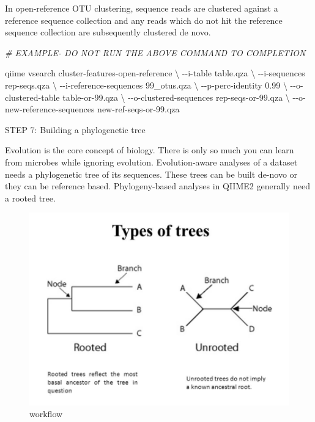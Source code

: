 \documentclass[
]{book}
\newenvironment{Shaded}{\begin{snugshade}}{\end{snugshade}}
\newcommand{\CommentTok}[1]{\textcolor[rgb]{0.56,0.35,0.01}{\textit{#1}}}
\newcommand{\DataTypeTok}[1]{\textcolor[rgb]{0.13,0.29,0.53}{#1}}
\newcommand{\ExtensionTok}[1]{#1}
\newcommand{\NormalTok}[1]{#1}
\begin{document}
In open-reference OTU clustering, sequence reads are clustered against a reference sequence collection and any reads which do not hit the reference sequence collection are subsequently clustered de novo.

\begin{Shaded}
\begin{Highlighting}[]

\CommentTok{\# EXAMPLE{-} DO NOT RUN THE ABOVE COMMAND TO COMPLETION}

\ExtensionTok{qiime}\NormalTok{ vsearch cluster{-}features{-}open{-}reference }\DataTypeTok{\textbackslash{}}
\NormalTok{{-}{-}i{-}table table.qza }\DataTypeTok{\textbackslash{}}
\NormalTok{{-}{-}i{-}sequences rep{-}seqs.qza }\DataTypeTok{\textbackslash{}}
\NormalTok{{-}{-}i{-}reference{-}sequences 99\_otus.qza }\DataTypeTok{\textbackslash{}}
\NormalTok{{-}{-}p{-}perc{-}identity 0.99 }\DataTypeTok{\textbackslash{}}
\NormalTok{{-}{-}o{-}clustered{-}table table{-}or{-}99.qza }\DataTypeTok{\textbackslash{}}
\NormalTok{{-}{-}o{-}clustered{-}sequences rep{-}seqs{-}or{-}99.qza }\DataTypeTok{\textbackslash{}}
\NormalTok{{-}{-}o{-}new{-}reference{-}sequences new{-}ref{-}seqs{-}or{-}99.qza}
\end{Highlighting}
\end{Shaded}

STEP 7: Building a phylogenetic tree

Evolution is the core concept of biology. There is only so much you can learn from microbes while ignoring evolution. Evolution-aware analyses of a dataset needs a phylogenetic tree of its sequences. These trees can be built de-novo or they can be reference based. Phylogeny-based analyses in QIIME2 generally need a rooted tree.

\begin{figure}
\centering
\includegraphics[width=1\textwidth,height=\textheight]{./QIIMEpics/forlyx.trees.qiime.png}
\caption{workflow}
\end{figure}
\end{document}
